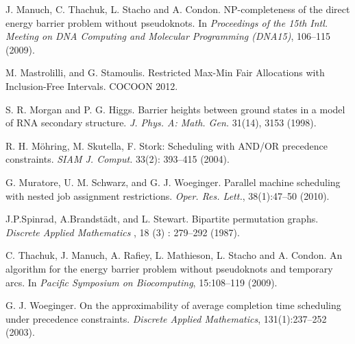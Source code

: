 \documentclass[letterpaper,11pt,abstracton]{scrartcl}
\begin{document}
{\begin{thebibliography}{999}
J. Manuch, C. Thachuk, L. Stacho and A. Condon.
NP-completeness of the direct energy barrier problem without pseudoknots.
In \emph{Proceedings of the 15th Intl. Meeting on DNA Computing and
Molecular Programming (DNA15)}, 106--115 (2009).


M. Mastrolilli, and G. Stamoulis.
Restricted Max-Min Fair Allocations with Inclusion-Free
               Intervals.  COCOON 2012.


S. R. Morgan and P. G. Higgs.
Barrier heights between ground states in a model of RNA secondary structure.
\emph{J. Phys. A: Math. Gen.} 31(14), 3153 (1998).


 R. H. M\"ohring, M. Skutella, F. Stork:
Scheduling with AND/OR precedence constraints. \emph{SIAM J. Comput.} 33(2): 393--415 (2004).


 G. Muratore, U. M. Schwarz, and G. J. Woeginger. Parallel machine scheduling with nested
job assignment restrictions. \emph{Oper. Res. Lett.}, 38(1):47--50 (2010).


 J.P.Spinrad, A.Brandst{\"{a}}dt, and L. Stewart.
Bipartite permutation graphs. \emph{Discrete Applied Mathematics }, 18 (3) : 279--292 (1987).


C. Thachuk, J. Manuch, A. Rafiey, L. Mathieson, L. Stacho and A. Condon.
An algorithm for the energy barrier problem without pseudoknots and
temporary arcs.
In {\em Pacific Symposium on Biocomputing}, 15:108--119 (2009).


 G. J. Woeginger. On the approximability of average completion time
scheduling under precedence constraints. \emph{Discrete Applied Mathematics},
131(1):237--252 (2003).

\end{thebibliography}
}
\end{document}
